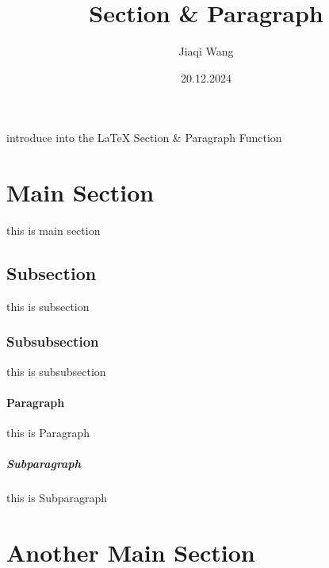 \documentclass[12pt, letterpaper]{article}
\title{Section \& Paragraph}
\date{20.12.2024}
\author{Jiaqi Wang}
\begin{document}
\maketitle
introduce into the \LaTeX{} Section \& Paragraph Function
\newpage
{}

\section{Main Section}
this is main section

\subsection{Subsection}
this is subsection

\subsubsection{Subsubsection}
this is subsubsection

\paragraph{Paragraph}
this is Paragraph

\subparagraph{Subparagraph}
this is Subparagraph

\section{Another Main Section}
\end{document}
